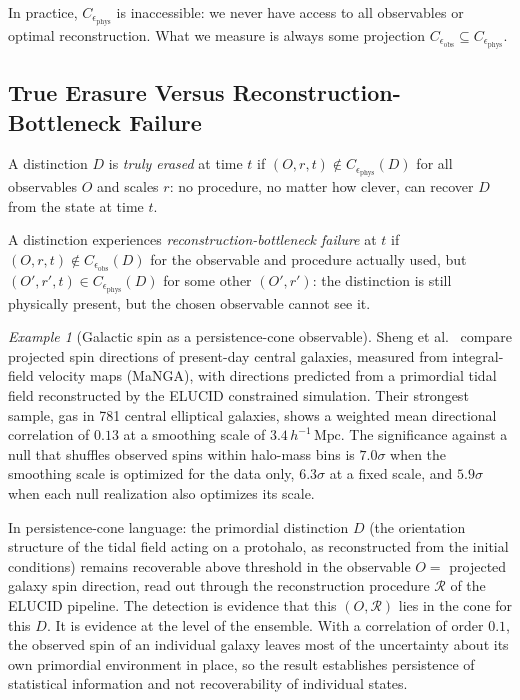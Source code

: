 \documentclass[12pt,a4paper,twoside,openright]{book}
\theoremstyle{plain}
\theoremstyle{definition}
\theoremstyle{remark}
\newtheorem{example}[theorem]{Example}
\newcommand{\Pcone}{C_\epsilon}
\begin{document}
In practice, $\Pcone_{\mathrm{phys}}$ is inaccessible: we never have access to all observables or optimal reconstruction. What we measure is always some projection $\Pcone_{\mathrm{obs}} \subseteq \Pcone_{\mathrm{phys}}$.

\subsection{True Erasure Versus Reconstruction-Bottleneck Failure}

A distinction $D$ is \emph{truly erased} at time $t$ if $(O, r, t) \notin \Pcone_{\mathrm{phys}}(D)$ for all observables $O$ and scales $r$: no procedure, no matter how clever, can recover $D$ from the state at time $t$.

A distinction experiences \emph{reconstruction-bottleneck failure} at $t$ if $(O, r, t) \notin \Pcone_{\mathrm{obs}}(D)$ for the observable and procedure actually used, but $(O', r', t) \in \Pcone_{\mathrm{phys}}(D)$ for some other $(O', r')$: the distinction is still physically present, but the chosen observable cannot see it.

\begin{example}[Galactic spin as a persistence-cone observable]
Sheng et al.~\cite{sheng2026tidaltorque} compare projected spin directions of present-day central galaxies, measured from integral-field velocity maps (MaNGA), with directions predicted from a primordial tidal field reconstructed by the ELUCID constrained simulation. Their strongest sample, gas in 781 central elliptical galaxies, shows a weighted mean directional correlation of $0.13$ at a smoothing scale of $3.4\,h^{-1}\,\mathrm{Mpc}$. The significance against a null that shuffles observed spins within halo-mass bins is $7.0\sigma$ when the smoothing scale is optimized for the data only, $6.3\sigma$ at a fixed scale, and $5.9\sigma$ when each null realization also optimizes its scale.

In persistence-cone language: the primordial distinction $D$ (the orientation structure of the tidal field acting on a protohalo, as reconstructed from the initial conditions) remains recoverable above threshold in the observable $O=$ projected galaxy spin direction, read out through the reconstruction procedure $\mathcal{R}$ of the ELUCID pipeline. The detection is evidence that this $(O,\mathcal{R})$ lies in the cone for this $D$. It is evidence at the level of the ensemble. With a correlation of order $0.1$, the observed spin of an individual galaxy leaves most of the uncertainty about its own primordial environment in place, so the result establishes persistence of statistical information and not recoverability of individual states.
\end{example}
\end{document}

